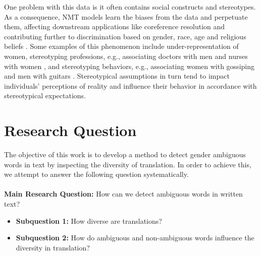 One problem with this data is it often contains social constructs and stereotypes. As a consequence, NMT models learn the biases from the data and perpetuate them, affecting downstream applications like coreference resolution \parencite{Zhao_2018_coreference} and contributing further to discrimination based on gender, race, age and religious beliefs \parencite{Rudinger_2017}. Some examples of this phenomenon include under-representation of women, stereotyping professions, e.g., associating doctors with men and nurses with women \parencite{Escud_Font_2019}, and stereotyping behaviors, e.g., associating women with gossiping and men with guitars \parencite{Rudinger_2017}. Stereotypical assumptions in turn tend to impact individuals' perceptions of reality and influence their behavior in accordance with stereotypical expectations.

\section{Research Question}
\label{sec:Introduction:Questions}

The objective of this work is to develop a method to detect gender ambiguous words in text by inspecting the diversity of translation. In order to achieve this, we attempt to answer the following question systematically.

\paragraph{} \textbf{Main Research Question:} How can we detect ambiguous words in written text?
\begin{itemize}
    \item \textbf{Subquestion 1:} How diverse are translations? %
    \item \textbf{Subquestion 2:} How do ambiguous and non-ambiguous words influence the diversity in translation? %
    
\end{itemize}


